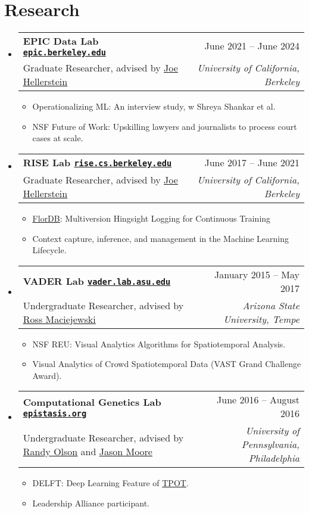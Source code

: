 \documentclass[letterpaper,11pt]{article}
\makeatletter
\newcommand{\resumeItem}[1]{
  \item\small{
    {#1 \vspace{-2pt}}
  }
}
\newcommand{\resumeSubheading}[4]{
  \vspace{-2pt}\item
    \begin{tabular*}{0.97\textwidth}[t]{l@{\extracolsep{\fill}}r}
      \textbf{#1} & #2 \\
      \small#3 & \textit{\small #4} \\
    \end{tabular*}\vspace{-7pt}
}
\newcommand{\resumeSubHeadingListStart}{\begin{itemize}[leftmargin=0.15in, label={}]}
\newcommand{\resumeSubHeadingListEnd}{\end{itemize}}
\newcommand{\resumeItemListStart}{\begin{itemize}}
\newcommand{\resumeItemListEnd}{\end{itemize}\vspace{-5pt}}
\makeatother
\begin{document}
\section{Research}
\resumeSubHeadingListStart

\resumeSubheading
{EPIC Data Lab
  \href{https://epic.berkeley.edu/}{\texttt{{epic.berkeley.edu}}}
}{June 2021 -- June 2024}
{Graduate Researcher, advised by \href{https://dsf.berkeley.edu/jmh/}{\underline{Joe Hellerstein}}}{University of California, Berkeley}
\resumeItemListStart
\resumeItem{Operationalizing ML: An interview study, w Shreya Shankar et al.}
\resumeItem{NSF Future of Work: Upskilling lawyers and journalists to process court cases at scale.}

\resumeItemListEnd

\resumeSubheading
{RISE Lab
  \href{https://rise.cs.berkeley.edu/}{\texttt{{rise.cs.berkeley.edu}}}
}{June 2017 -- June 2021}
{Graduate Researcher, advised by \href{https://dsf.berkeley.edu/jmh/}{\underline{Joe Hellerstein}}}{University of California, Berkeley}
\resumeItemListStart
\resumeItem{\href{https://github.com/ucbrise/flor}{\underline{FlorDB}}: Multiversion Hingsight Logging for Continuous Training}
\resumeItem{Context capture, inference, and management in the Machine Learning Lifecycle.}

\resumeItemListEnd


\resumeSubheading
{VADER Lab
  \href{http://vader.lab.asu.edu/}
  {\texttt{{vader.lab.asu.edu}}}
}{January 2015 -- May 2017}
{Undergraduate Researcher, advised by \href{http://rmaciejewski.faculty.asu.edu/}{\underline{Ross Maciejewski}}}{Arizona State University, Tempe}
\resumeItemListStart
\resumeItem{NSF REU: Visual Analytics Algorithms for Spatiotemporal Analysis.}
\resumeItem{Visual Analytics of Crowd Spatiotemporal Data (VAST Grand Challenge Award).}
\resumeItemListEnd

\resumeSubheading
{Computational Genetics Lab
  \href{http://epistasis.org/}
  {\texttt{{epistasis.org}}}
}{June 2016 -- August 2016}
{Undergraduate Researcher, advised by \href{https://twitter.com/randal_olson}{\underline{Randy Olson}}
  and
  \href{http://epistasis.org/jason-h-moore-phd/}{\underline{Jason Moore}}
}
{University of Pennsylvania, Philadelphia}
\resumeItemListStart
\resumeItem{DELFT: Deep Learning Feature of \href{http://epistasislab.github.io/tpot/}{TPOT}.}
\resumeItem{Leadership Alliance participant.}
\resumeItemListEnd


\resumeSubHeadingListEnd
\end{document}
